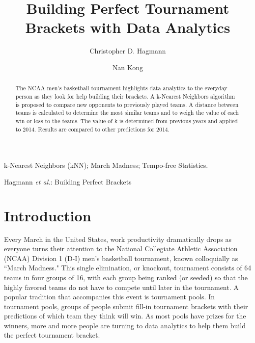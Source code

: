 \documentclass[5p, preprint]{elsarticle}
\begin{document}
\title{Building Perfect Tournament Brackets with Data Analytics}

\author{Christopher D. Hagmann}

\author{Nan Kong}


\begin{abstract}
The NCAA men's basketball tournament highlights data analytics to the everyday person as they look for help building their brackets. A k-Nearest Neighbors algorithm is proposed to compare new opponents to previously played teams. A distance between teams is calculated to determine the most similar teams and to weigh the value of each win or loss to the teams. The value of k is determined from previous years and applied to 2014. Results are compared to other predictions for 2014.
\end{abstract}

\begin{keyword}
k-Nearest Neighbors (kNN); March Madness; Tempo-free Statistics.
\end{keyword}


%
{Hagmann \MakeLowercase{\textit{et al.}}: Building Perfect Brackets}


\maketitle


\section{Introduction}
Every March in the United States, work productivity dramatically drops as everyone turns their attention to the National Collegiate Athletic Association (NCAA) Division 1 (D-I) men's basketball tournament, known colloquially as ``March Madness."  This single elimination, or knockout, tournament consists of 64 teams in four groups of 16, with each group being ranked (or seeded) so that the highly favored teams do not have to compete until later in the tournament. A popular tradition that accompanies this event is tournament pools. In tournament pools, groups of people submit fill-in tournament brackets with their predictions of which team they think will win. As most pools have prizes for the winners, more and more people are turning to data analytics to help them build the perfect tournament bracket. 
\end{document}
